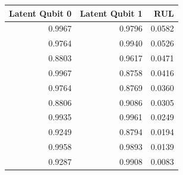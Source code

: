\begin{tabular}{rrr}
\toprule
Latent Qubit 0 & Latent Qubit 1 & RUL \\
\midrule
0.9967 & 0.9796 & 0.0582 \\
0.9764 & 0.9940 & 0.0526 \\
0.8803 & 0.9617 & 0.0471 \\
0.9967 & 0.8758 & 0.0416 \\
0.9764 & 0.8769 & 0.0360 \\
0.8806 & 0.9086 & 0.0305 \\
0.9935 & 0.9961 & 0.0249 \\
0.9249 & 0.8794 & 0.0194 \\
0.9958 & 0.9893 & 0.0139 \\
0.9287 & 0.9908 & 0.0083 \\
\bottomrule
\end{tabular}
